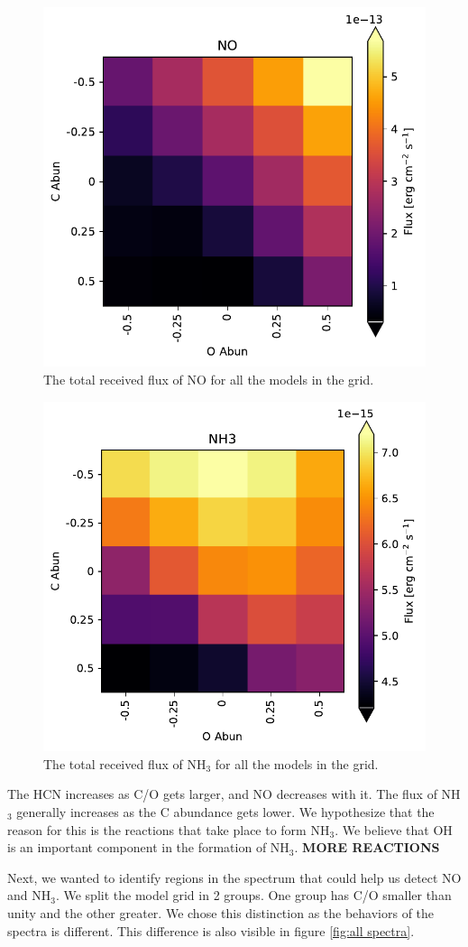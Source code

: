\documentclass[twoside, single, authoryear, semicolon]{lion-msc}
\newcommand{\3}{$_3$}
\newcommand{\2}{$_2$}
\begin{document}
\begin{figure}[!ht]
    \centering
    \includegraphics[width=0.5\linewidth]{Figures/NO_heatmap.pdf}
    \caption{The total received flux of NO for all the models in the grid.}
    \label{fig:flux NO}
\end{figure}
\begin{figure}[!ht]
    \centering
    \includegraphics[width=0.5\linewidth]{Figures/NH3_heatmap.pdf}
    \caption{The total received flux of NH\3 for all the models in the grid.}
    \label{fig:flux NH3}
\end{figure}

The HCN increases as C/O gets larger, and NO decreases with it. The flux of NH\3 generally increases as the C abundance gets lower. We hypothesize that the reason for this is the reactions that take place to form NH\3.
We believe that OH is an important component in the formation of NH\3. 
\textbf{MORE REACTIONS}

Next, we wanted to identify regions in the spectrum that could help us detect NO and NH\3. We split the model grid in 2 groups. One group has C/O smaller than unity and the other greater. We chose this distinction as the behaviors of the spectra is different. This difference is also visible in figure \ref{fig:all spectra}. 
\end{document}
